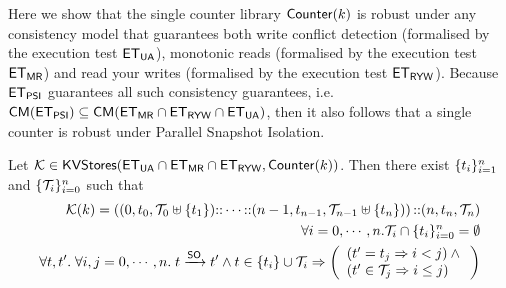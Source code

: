 Here we show that the  single counter library $\mathsf{Counter}(k)$ is robust under any consistency model 
that guarantees both write conflict detection (formalised by the execution test 
$\mathsf{ET}_{\mathsf{UA}}$), monotonic reads (formalised by the execution test $\mathsf{ET}_{\mathsf{MR}}$) 
and read your writes (formalised by the execution test $\mathsf{ET}_{\mathsf{RYW}}$). 
Because $\mathsf{ET}_{\mathsf{PSI}}$ guarantees all such consistency guarantees, i.e. 
$\mathsf{CM}(\mathsf{ET}_{\mathsf{PSI}}) \subseteq \mathsf{CM}(\mathsf{ET}_{\mathsf{MR}} \cap \mathsf{ET}_{\mathsf{RYW}} \cap \mathsf{ET}_{\mathsf{UA}})$, 
then it also follows that a single counter is robust under Parallel Snapshot Isolation.
\begin{proposition}
\label{prop:counter_hhshape}
Let $\mathcal{K} \in \mathsf{KVStores}(\mathsf{ET}_{\mathsf{UA}} \cap \mathsf{ET}_{\mathsf{MR}} \cap \mathsf{ET}_{\mathsf{RYW}}, \mathsf{Counter}(k))$. 
Then there exist $\{t_i\}_{i = 1}^{n}$ and $\{\mathcal{T}_{i}\}_{i = 0}^{n}$ such that 
\begin{align}
\hh(\ke) = \left( (0, \txid_{0}, \T_{0} \uplus \{\txid_1\}) \lcat \cdots \lcat (n-1, \txid_{n-1}, \T_{n-1} \uplus \{\txid_{n}\}) \right) 
\lcat (n, \txid_{n}, \T_{n}) \label{eq:psi_counter_shape}\\
\forall i=0,\cdots,n.\T_{i} \cap \{\txid_{i}\}_{i=0}^{n} = \emptyset \label{eq:psi_counter_rwtxs}\\
\forall \txid, \txid'.\;\forall i,j=0,\cdots, n.\; \txid \xrightarrow{\PO} \txid' 
\wedge \txid \in \{\txid_{i}\} \cup \T_{i} \implies 
\left(\begin{array}{l}
(\txid' = \txid_{j} \implies i < j) \wedge {} \\
(\txid' \in \T_{j} \implies i \leq j) \\
\end{array}\right) \label{eq:psi_counter_so}
\end{align}
%
%
%
\end{proposition}


